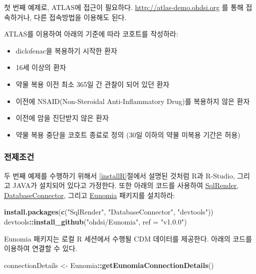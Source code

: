 \documentclass[11pt]{book}
\newenvironment{Shaded}{\begin{snugshade}}{\end{snugshade}}
\newcommand{\KeywordTok}[1]{\textcolor[rgb]{0.13,0.29,0.53}{\textbf{#1}}}
\newcommand{\DataTypeTok}[1]{\textcolor[rgb]{0.13,0.29,0.53}{#1}}
\newcommand{\StringTok}[1]{\textcolor[rgb]{0.31,0.60,0.02}{#1}}
\newcommand{\OperatorTok}[1]{\textcolor[rgb]{0.81,0.36,0.00}{\textbf{#1}}}
\newcommand{\NormalTok}[1]{#1}
\providecommand{\tightlist}{%
  \setlength{\itemsep}{0pt}\setlength{\parskip}{0pt}}
\theoremstyle{definition}
\theoremstyle{definition}
\theoremstyle{definition}
\theoremstyle{remark}
\let\BeginKnitrBlock\begin \let\EndKnitrBlock\end
\begin{document}
첫 번째 예제로, ATLAS에 접근이 필요하다.
\url{http://atlas-demo.ohdsi.org} 를 통해 접속하거나, 다른 접속방법을
이용해도 된다.

\BeginKnitrBlock{exercise}
\protect\hypertarget{exr:exerciseCohortsAtlas}{}{\label{exr:exerciseCohortsAtlas}
}ATLAS를 이용하여 아래의 기준에 따라 코호트를 작성하라:

\begin{itemize}
\tightlist
\item
  diclofenac을 복용하기 시작한 환자
\item
  16세 이상의 환자
\item
  약물 복용 이전 최소 365일 간 관찰이 되어 있던 환자
\item
  이전에 NSAID(Non-Steroidal Anti-Inflammatory Drug)를 복용하지 않은
  환자
\item
  이전에 암을 진단받지 않은 환자
\item
  약물 복용 중단을 코호트 종료로 정의 (30일 이하의 약물 미복용 기간은
  허용)
\end{itemize}
\EndKnitrBlock{exercise}

\subsubsection*{전제조건}\label{-3}

두 번째 예제를 수행하기 위해서 \ref{installR}절에서 설명된 것처럼 R과
R-Studio, 그리고 JAVA가 설치되어 있다고 가정한다. 또한 아래의 코드를
사용하여 \href{https://ohdsi.github.io/SqlRender/}{SqlRender},
\href{https://ohdsi.github.io/DatabaseConnector/}{DatabaseConnector},
그리고 \href{https://ohdsi.github.io/Eunomia/}{Eunomia} 패키지를
설치하라:

\begin{Shaded}
\begin{Highlighting}[]
\KeywordTok{install.packages}\NormalTok{(}\KeywordTok{c}\NormalTok{(}\StringTok{"SqlRender"}\NormalTok{, }\StringTok{"DatabaseConnector"}\NormalTok{, }\StringTok{"devtools"}\NormalTok{))}
\NormalTok{devtools}\OperatorTok{::}\KeywordTok{install_github}\NormalTok{(}\StringTok{"ohdsi/Eunomia"}\NormalTok{, }\DataTypeTok{ref =} \StringTok{"v1.0.0"}\NormalTok{)}
\end{Highlighting}
\end{Shaded}

Eunomia 패키지는 로컬 R 세션에서 수행될 CDM 데이터를 제공한다. 아래의
코드를 이용하여 연결할 수 있다.

\begin{Shaded}
\begin{Highlighting}[]
\NormalTok{connectionDetails <-}\StringTok{ }\NormalTok{Eunomia}\OperatorTok{::}\KeywordTok{getEunomiaConnectionDetails}\NormalTok{()}
\end{Highlighting}
\end{Shaded}
\end{document}
